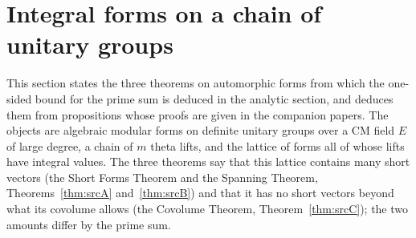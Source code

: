 \documentclass[10pt]{amsart}
\theoremstyle{definition}
\theoremstyle{remark}
\newcommand{\Q}{\mathbb Q}
\begin{document}
\providecommand{\auDataRef}{\ref{an:data}}
\providecommand{\auO}{\mathcal O}
\providecommand{\auI}{\mathcal I}
\providecommand{\auQlb}{\overline{\Q}_\ell}
\providecommand{\auAut}{\operatorname{Aut}}
\providecommand{\auNm}{\operatorname{Nm}}
\providecommand{\auGram}{\operatorname{Gram}}
\providecommand{\aucol}{\operatorname{col}}
\providecommand{\auU}{\mathrm U}
\providecommand{\auGL}{\mathrm{GL}}
\providecommand{\auHom}{\operatorname{Hom}}
\providecommand{\auEnd}{\operatorname{End}}
\providecommand{\auA}{\mathbb A}
\providecommand{\auF}{\mathbb F}
\providecommand{\auPl}{\Phi}
\providecommand{\auPa}{\Phi_a}
\providecommand{\auPb}{\Phi_b}
\providecommand{\auS}{\mathcal S}
\providecommand{\auSram}{\mathcal S^{\mathrm{ram}}}
\providecommand{\auT}{\mathcal T}
\providecommand{\auAz}{\mathcal A_0}
\providecommand{\auAm}{\mathcal A_m}
\providecommand{\auG}{\overline G}
\providecommand{\auP}{\mathcal P}
\providecommand{\aupp}{\mathfrak p}
\providecommand{\auLat}{\mathcal L}
\providecommand{\audT}{d_{\auT}}
\providecommand{\auDX}{D_X}
\providecommand{\augain}{\operatorname{gain}}
\providecommand{\auerr}{\operatorname{err}}
\providecommand{\auhmain}{h_{\mathrm{main}}}
\providecommand{\auhdir}{h_{\mathrm{dir}}}
\providecommand{\aurem}{\operatorname{rem}}
\providecommand{\ausinf}{s_\infty}
\providecommand{\ausfin}{s_{\mathrm{fin}}}
\providecommand{\ausmain}{s_{\mathrm{main}}}
\providecommand{\aueu}{\varepsilon_{\mathrm u}}
\providecommand{\aurd}{\mathrm{rd}_E}
\providecommand{\aucB}{c_B}
\providecommand{\aubud}{\mathrm{bud}}
\providecommand{\auchi}{\chi_K}
\providecommand{\aubar}[1]{\overline{#1}}
\providecommand{\auf}[1]{\texttt{#1}}
\providecommand{\ausource}[1]{}

\section{Integral forms on a chain of unitary groups}\label{sec:automorphic}

This section states the three theorems on automorphic forms
from which the one-sided bound for the prime sum is deduced in the analytic section, and deduces
them from propositions whose proofs are given in the companion papers. The objects
are algebraic modular forms on definite unitary groups over a CM field $E$ of large degree, a
chain of $m$ theta lifts, and the lattice of forms all of whose lifts have integral values. The
three theorems say that this lattice contains many short vectors (the Short Forms Theorem and the
Spanning Theorem, Theorems~\ref{thm:srcA}
and~\ref{thm:srcB}) and that it has no short vectors beyond what its covolume allows
(the Covolume Theorem, Theorem~\ref{thm:srcC}); the two amounts differ by the prime sum.
\end{document}
